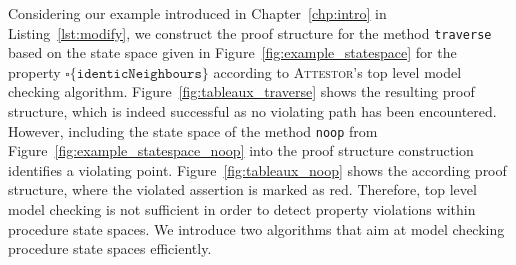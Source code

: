 \documentclass[a4paper, 12pt, twoside]{report}
\begin{document}
	Considering our example introduced in Chapter~\ref{chp:intro} in Listing~\ref{lst:modify}, we construct the proof structure for the method \texttt{traverse} based on the state space given in Figure~\ref{fig:example_statespace} for the property $\square \{\texttt{identicNeighbours}\}$ according to \textsc{Attestor}'s top level model checking algorithm. Figure~\ref{fig:tableaux_traverse} shows the resulting proof structure, which is indeed successful as no violating path has been encountered. However, including the state space of the method \texttt{noop} from Figure~\ref{fig:example_statespace_noop} into the proof structure construction identifies a violating point. Figure~\ref{fig:tableaux_noop} shows the according proof structure, where the violated assertion is marked as red. Therefore, top level model checking is not sufficient in order to detect property violations within procedure state spaces. We introduce two algorithms that aim at model checking procedure state spaces efficiently.\\
	
\end{document}
